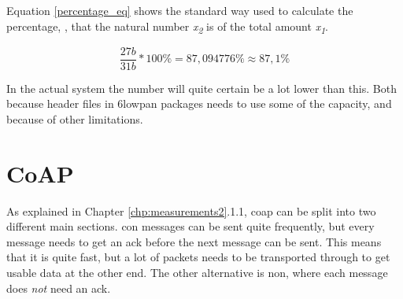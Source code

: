 Equation \ref{percentage_eq} shows the standard way used to calculate the percentage, \textdelta , that the natural number \textit{x\textsubscript{2}} is of the total amount \textit{x\textsubscript{1}}. 

\begin{equation}
    \frac{27 b}{31 b}*100 \% = 87,094776 \% \approx 87,1 \%
\end{equation}





In the actual system the number will quite certain be a lot lower than this. Both because header files in \gls{6lowpan} packages needs to use some of the capacity, and because of other limitations. 


\section{CoAP}

As explained in Chapter \ref{chp:measurements2}.1.1, \gls{coap} can be split into two different main sections. \gls{con} messages can be sent quite frequently, but every message needs to get an \gls{ack} before the next message can be sent. This means that it is quite fast, but a lot of packets needs to be transported through to get usable data at the other end. The other alternative is \gls{non}, where each message does \textit{not} need an \gls{ack}. 






